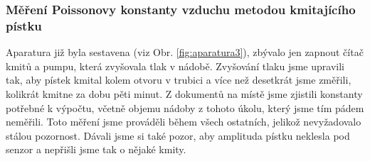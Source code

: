 \documentclass[english]{article}
\begin{document}
			\subsubsection{Měření Poissonovy konstanty vzduchu metodou kmitajícího pístku}
					Aparatura již byla sestavena (viz Obr. \ref{fig:aparatura3}), zbývalo jen zapnout čítač kmitů a pumpu, která zvyšovala tlak v nádobě. Zvyšování tlaku jsme upravili tak, aby pístek kmital kolem otvoru v trubici a více než desetkrát jsme změřili, kolikrát kmitne za dobu pěti minut. Z dokumentů na místě jsme zjistili konstanty potřebné k výpočtu, včetně objemu nádoby z tohoto úkolu, který jsme tím pádem neměřili. Toto měření jsme prováděli během všech ostatních, jelikož nevyžadovalo stálou pozornost. Dávali jsme si také pozor, aby amplituda pístku neklesla pod senzor a nepřišli jsme tak o nějaké kmity.
					
\end{document}
